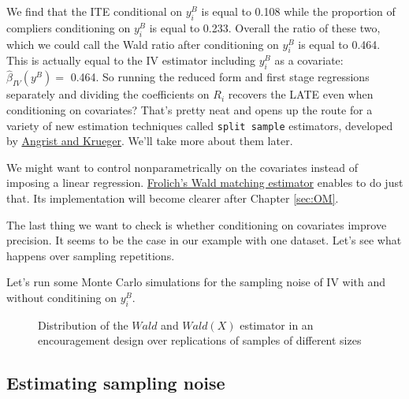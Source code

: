 \documentclass[]{book}
\theoremstyle{definition}
\theoremstyle{definition}
\theoremstyle{definition}
\theoremstyle{remark}
\let\BeginKnitrBlock\begin \let\EndKnitrBlock\end
\begin{document}
We find that the ITE conditional on \(y^B_i\) is equal to 0.108 while the proportion of compliers conditioning on \(y_i^B\) is equal to 0.233.
Overall the ratio of these two, which we could call the Wald ratio after conditioning on \(y_i^B\) is equal to 0.464.
This is actually equal to the IV estimator including \(y_i^B\) as a covariate: \(\hat{\beta}_{IV}(y^B)=\) 0.464.
So running the reduced form and first stage regressions separately and dividing the coefficients on \(R_i\) recovers the LATE even when conditioning on covariates?
That's pretty neat and opens up the route for a variety of new estimation techniques called \texttt{split\ sample} estimators, developed by \href{http://economics.mit.edu/files/398}{Angrist and Krueger}.
We'll take more about them later.

\BeginKnitrBlock{remark}
\iffalse{} {Remark. } \fi{}We might want to control nonparametrically on the covariates instead of imposing a linear regression.
\href{https://www.sciencedirect.com/science/article/abs/pii/S0304407606001023}{Frolich's Wald matching estimator} enables to do just that.
Its implementation will become clearer after Chapter \ref{sec:OM}.
\EndKnitrBlock{remark}

\BeginKnitrBlock{remark}
\iffalse{} {Remark. } \fi{}The last thing we want to check is whether conditioning on covariates improve precision.
It seems to be the case in our example with one dataset.
Let's see what happens over sampling repetitions.
\EndKnitrBlock{remark}

\BeginKnitrBlock{example}
\protect\hypertarget{exm:unnamed-chunk-130}{}{\label{exm:unnamed-chunk-130} }Let's run some Monte Carlo simulations for the sampling noise of IV with and without conditining on \(y_i^B\).
\EndKnitrBlock{example}

\begin{figure}[htbp]

{\centering {}

}

\caption{Distribution of the $Wald$ and $Wald(X)$ estimator in an encouragement design over replications of samples of different sizes}\label{fig:MonteCarloHistEncourage}
\end{figure}

\hypertarget{estimating-sampling-noise-3}{%
\subsection{Estimating sampling noise}\label{estimating-sampling-noise-3}}
\end{document}

